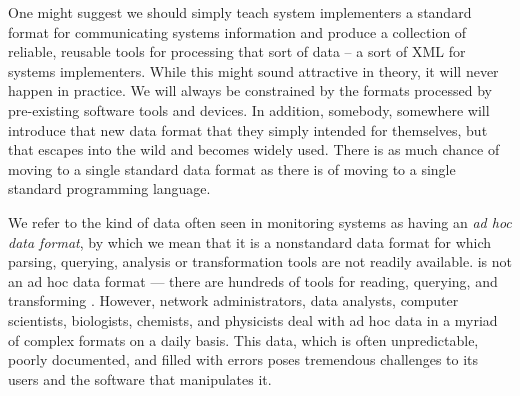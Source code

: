 \documentclass[11pt]{article}
\begin{document}

One might suggest we should simply teach system implementers a standard
format for communicating systems information and produce a collection of 
reliable, reusable tools for processing that sort of data -- a sort of
XML for systems implementers.  While this might 
sound attractive in theory, it will never happen in practice.  We 
will always be constrained by 
the formats processed by pre-existing software tools and devices.
In addition, somebody, somewhere will
introduce that new data format that they simply intended for themselves, but
that escapes into the wild and becomes widely used.  There is as much
chance of moving to a single standard data format
as there is of moving to a single standard programming language.



We refer to the kind of data often seen in monitoring systems 
as having an {\em ad hoc data format},
by which we mean that it is a nonstandard data format for which
parsing, querying, analysis or transformation tools are not readily
available.  \xml{} is not an ad hoc data format --- there are hundreds
of tools for reading, querying, and transforming \xml{}.  However,
network administrators, data analysts, computer scientists,
biologists, chemists, and physicists deal with ad hoc data in a myriad
of complex formats on a daily basis.  This data, which is often
unpredictable, poorly documented, and filled with errors poses
tremendous challenges to its users and the software that manipulates
it.  
\end{document}
